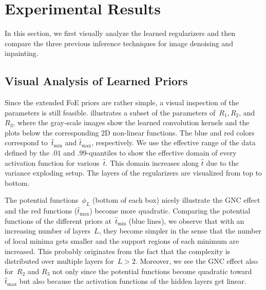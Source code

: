 \documentclass{article}
\def\hatt{{\widehat{t}}}
\newcommand{\tminh}{\hatt_\mathrm{min}}
\newcommand{\tmaxh}{\hatt_\mathrm{max}}
\theoremstyle{plain}
\theoremstyle{definition}
\theoremstyle{remark}
\begin{document}
\section{Experimental Results}
In this section, we first visually analyze the learned regularizers and then compare the three previous inference techniques for image denoising and inpainting.

\subsection{Visual Analysis of Learned Priors}
Since the extended FoE priors are rather simple, a visual inspection of the parameters is still feasible.
 illustrates a subset of the parameters of~$R_1,R_2$, and $R_3$, where the gray-scale images show the learned convolution kernels and the plots below the corresponding 2D non-linear functions.
The blue and red colors correspond to~$\tminh$ and $\tmaxh$, respectively.
We use the effective range of the data defined by the $.01$ and $.99$-quantiles to show the effective domain of every activation function for various~$\hatt$.
This domain increases along $\hatt$ due to the variance exploding setup.
The layers of the regularizers are visualized from top to bottom.

The potential functions~$\phi_L$ (bottom of each box) nicely illustrate the GNC effect and the red functions ($\tmaxh$) become more quadratic.
Comparing the potential functions of the different priors at~$\tminh$ (blue lines), we observe that with an increasing number of layers~$L$, they become simpler in the sense that the number of local minima gets smaller and the support regions of each minimum are increased.
This probably originates from the fact that the complexity is distributed over multiple layers for~$L>2$.
Moreover, we see the GNC effect also for~$R_2$ and $R_3$ not only since the potential functions become quadratic toward~$\tmaxh$ but also because the activation functions of the hidden layers get linear.
\end{document}
